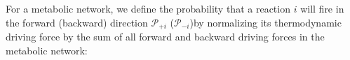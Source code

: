 For a metabolic network, we define the probability that a reaction $i$ will fire in the forward (backward)  direction ${\mathcal P_{+i}}$ ($\mathcal P_{-i}$)by normalizing its thermodynamic driving force by the sum of all forward and backward driving forces in the metabolic network: